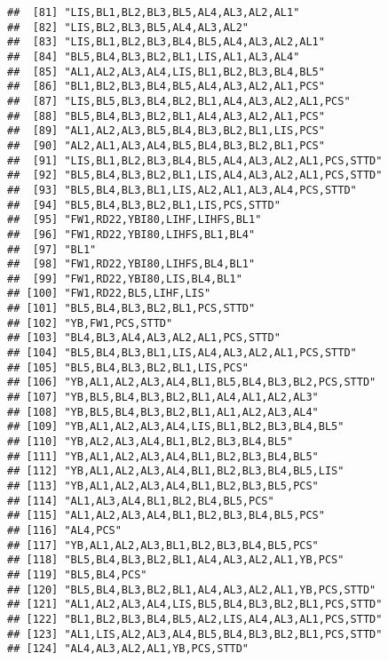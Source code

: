 \documentclass[
]{article}
\begin{document}
\begin{verbatim}
##  [81] "LIS,BL1,BL2,BL3,BL5,AL4,AL3,AL2,AL1"             
##  [82] "LIS,BL2,BL3,BL5,AL4,AL3,AL2"                     
##  [83] "LIS,BL1,BL2,BL3,BL4,BL5,AL4,AL3,AL2,AL1"         
##  [84] "BL5,BL4,BL3,BL2,BL1,LIS,AL1,AL3,AL4"             
##  [85] "AL1,AL2,AL3,AL4,LIS,BL1,BL2,BL3,BL4,BL5"         
##  [86] "BL1,BL2,BL3,BL4,BL5,AL4,AL3,AL2,AL1,PCS"         
##  [87] "LIS,BL5,BL3,BL4,BL2,BL1,AL4,AL3,AL2,AL1,PCS"     
##  [88] "BL5,BL4,BL3,BL2,BL1,AL4,AL3,AL2,AL1,PCS"         
##  [89] "AL1,AL2,AL3,BL5,BL4,BL3,BL2,BL1,LIS,PCS"         
##  [90] "AL2,AL1,AL3,AL4,BL5,BL4,BL3,BL2,BL1,PCS"         
##  [91] "LIS,BL1,BL2,BL3,BL4,BL5,AL4,AL3,AL2,AL1,PCS,STTD"
##  [92] "BL5,BL4,BL3,BL2,BL1,LIS,AL4,AL3,AL2,AL1,PCS,STTD"
##  [93] "BL5,BL4,BL3,BL1,LIS,AL2,AL1,AL3,AL4,PCS,STTD"    
##  [94] "BL5,BL4,BL3,BL2,BL1,LIS,PCS,STTD"                
##  [95] "FW1,RD22,YBI80,LIHF,LIHFS,BL1"                   
##  [96] "FW1,RD22,YBI80,LIHFS,BL1,BL4"                    
##  [97] "BL1"                                             
##  [98] "FW1,RD22,YBI80,LIHFS,BL4,BL1"                    
##  [99] "FW1,RD22,YBI80,LIS,BL4,BL1"                      
## [100] "FW1,RD22,BL5,LIHF,LIS"                           
## [101] "BL5,BL4,BL3,BL2,BL1,PCS,STTD"                    
## [102] "YB,FW1,PCS,STTD"                                 
## [103] "BL4,BL3,AL4,AL3,AL2,AL1,PCS,STTD"                
## [104] "BL5,BL4,BL3,BL1,LIS,AL4,AL3,AL2,AL1,PCS,STTD"    
## [105] "BL5,BL4,BL3,BL2,BL1,LIS,PCS"                     
## [106] "YB,AL1,AL2,AL3,AL4,BL1,BL5,BL4,BL3,BL2,PCS,STTD" 
## [107] "YB,BL5,BL4,BL3,BL2,BL1,AL4,AL1,AL2,AL3"          
## [108] "YB,BL5,BL4,BL3,BL2,BL1,AL1,AL2,AL3,AL4"          
## [109] "YB,AL1,AL2,AL3,AL4,LIS,BL1,BL2,BL3,BL4,BL5"      
## [110] "YB,AL2,AL3,AL4,BL1,BL2,BL3,BL4,BL5"              
## [111] "YB,AL1,AL2,AL3,AL4,BL1,BL2,BL3,BL4,BL5"          
## [112] "YB,AL1,AL2,AL3,AL4,BL1,BL2,BL3,BL4,BL5,LIS"      
## [113] "YB,AL1,AL2,AL3,AL4,BL1,BL2,BL3,BL5,PCS"          
## [114] "AL1,AL3,AL4,BL1,BL2,BL4,BL5,PCS"                 
## [115] "AL1,AL2,AL3,AL4,BL1,BL2,BL3,BL4,BL5,PCS"         
## [116] "AL4,PCS"                                         
## [117] "YB,AL1,AL2,AL3,BL1,BL2,BL3,BL4,BL5,PCS"          
## [118] "BL5,BL4,BL3,BL2,BL1,AL4,AL3,AL2,AL1,YB,PCS"      
## [119] "BL5,BL4,PCS"                                     
## [120] "BL5,BL4,BL3,BL2,BL1,AL4,AL3,AL2,AL1,YB,PCS,STTD" 
## [121] "AL1,AL2,AL3,AL4,LIS,BL5,BL4,BL3,BL2,BL1,PCS,STTD"
## [122] "BL1,BL2,BL3,BL4,BL5,AL2,LIS,AL4,AL3,AL1,PCS,STTD"
## [123] "AL1,LIS,AL2,AL3,AL4,BL5,BL4,BL3,BL2,BL1,PCS,STTD"
## [124] "AL4,AL3,AL2,AL1,YB,PCS,STTD"                     

\end{verbatim}
\end{document}
